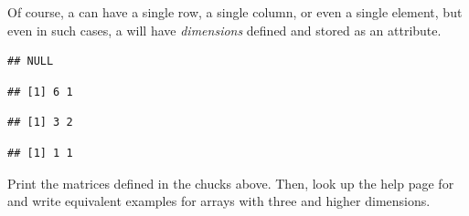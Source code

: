 \documentclass[krantz2,ChapterTOCs]{krantz}\usepackage{knitr}
\begin{document}
\begin{explainbox}
Of course, a  can have a single row, a single column, or even a single element, but even in such cases, a  will have \emph{dimensions} defined and stored as an attribute.

\begin{knitrout}\footnotesize
{}\color{fgcolor}\begin{kframe}
\begin{alltt}
 \hlkwb{<-} \hlopt{:}
\end{alltt}
\begin{verbatim}
## NULL
\end{verbatim}
\end{kframe}
\end{knitrout}

\begin{knitrout}\footnotesize
{}\color{fgcolor}\begin{kframe}
\begin{alltt}
 \hlkwb{<-} \hlstd{(}\hlopt{:}\hlstd{,}  \hlstd{=} \hlstd{)}
\end{alltt}
\begin{verbatim}
## [1] 6 1
\end{verbatim}
\begin{alltt}
 \hlkwb{<-} \hlstd{(}\hlopt{:}\hlstd{,}  \hlstd{=} \hlstd{)}
\end{alltt}
\begin{verbatim}
## [1] 3 2
\end{verbatim}
\begin{alltt}
 \hlkwb{<-} \hlstd{(}\hlstd{,}  \hlstd{=} \hlstd{)}
\end{alltt}
\begin{verbatim}
## [1] 1 1
\end{verbatim}
\end{kframe}
\end{knitrout}

\begin{playground}
Print the matrices defined in the chucks above. Then, look up the help page for  and write equivalent examples for arrays with three and higher dimensions.
\end{playground}
\end{explainbox}
\end{document}
